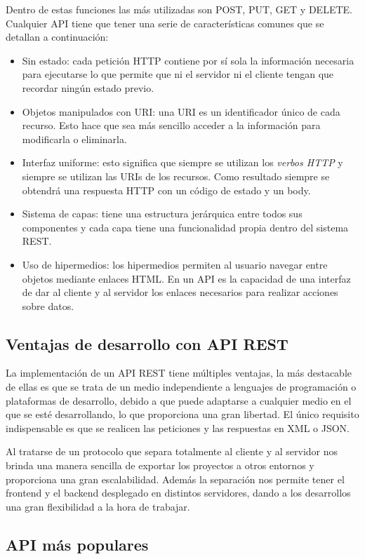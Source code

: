 Dentro de estas funciones las más utilizadas son POST, PUT, GET y DELETE. Cualquier API tiene que tener una serie de características comunes que se detallan a continuación:

\begin{itemize}
    \item Sin estado: cada petición HTTP contiene por sí sola la información necesaria para ejecutarse lo que permite que ni el servidor ni el cliente tengan que recordar ningún estado previo.
    \item Objetos manipulados con URI: una URI es un identificador único de cada recurso. Esto hace que sea más sencillo acceder a la información para modificarla o eliminarla.
    \item Interfaz uniforme: esto significa que siempre se utilizan los \textit{verbos HTTP} y siempre se utilizan las URIs de los recursos. Como resultado siempre se obtendrá una respuesta HTTP con un código de estado y un body.
    \item Sistema de capas: tiene una estructura jerárquica entre todos sus componentes y cada capa tiene una funcionalidad propia dentro del sistema REST. 
    \item Uso de hipermedios: los hipermedios permiten al usuario navegar entre objetos mediante enlaces HTML. En un API es la capacidad de una interfaz de dar al cliente y al servidor los enlaces necesarios para realizar acciones sobre datos.
\end{itemize}

\subsection{Ventajas de desarrollo con API REST}

La implementación de un API REST tiene múltiples ventajas, la más destacable de ellas es que se trata de un medio independiente a lenguajes de programación o plataformas de desarrollo, debido a que puede adaptarse a cualquier medio en el que se esté desarrollando, lo que proporciona una gran libertad. El único requisito indispensable es que se realicen las peticiones y las respuestas en XML o JSON. 

Al tratarse de un protocolo que separa totalmente al cliente y al servidor nos brinda una manera sencilla de exportar los proyectos a otros entornos y proporciona una gran escalabilidad. Además la separación nos permite tener el frontend y el backend desplegado en distintos servidores, dando a los desarrollos una gran flexibilidad a la hora de trabajar.


\subsection{API más populares}
